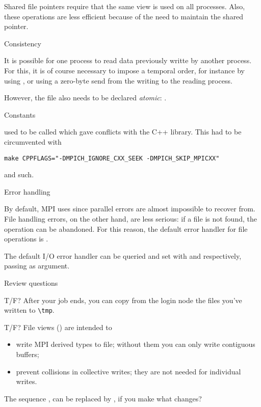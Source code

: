 Shared file pointers require that the same view is used on all processes.
Also, these operations are less efficient because of the need to maintain the
shared pointer.

 {Consistency}

It is possible for one process to read data previously writte by another process.
For this, it is of course necessary to impose a temporal order,
for instance by using ,
or using a zero-byte send from the writing to the reading process.

However, the file also needs to be declared
\emph{atomic}:
.

 {Constants}

 used to be called 
which gave conflicts with the C++ library. This had to be circumvented
with
\begin{verbatim}
make CPPFLAGS="-DMPICH_IGNORE_CXX_SEEK -DMPICH_SKIP_MPICXX"
\end{verbatim}
and such.

 {Error handling}
\label{sec:mpi-file-err}

By default, MPI uses  since parallel errors
are almost impossible to recover from.
File handling errors, on the other hand, are less serious:
if a file is not found, the operation can be abandoned.
For this reason, the default error handler for file operations
is .

The default I/O error handler can be queried and set with
 and 
 respectively,
passing  as argument.


\newpage
{} {Review questions}

\begin{tacc}
  \begin{exercise}
    T/F?
    After your  job ends, you can copy
    from the login node
    the files you've written to \verb+\tmp+. 
\end{exercise}
\end{tacc}

\begin{exercise}
  T/F?
  File views () are intended to
  \begin{itemize}
  \item write MPI derived types to file; without them you can only write
    contiguous buffers;
  \item prevent collisions in collective writes; they are not needed for
    individual writes.
  \end{itemize}
\end{exercise}

\begin{exercise}
  The sequence , 
  can be replaced by , 
  if you make what changes?
\end{exercise}
